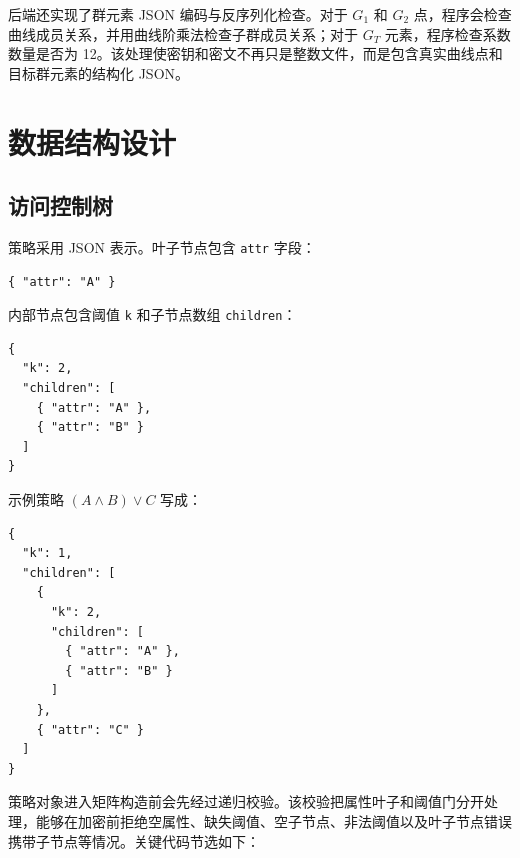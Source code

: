 后端还实现了群元素 JSON 编码与反序列化检查。对于 $G_1$ 和 $G_2$ 点，程序会检查曲线成员关系，并用曲线阶乘法检查子群成员关系；对于 $G_T$ 元素，程序检查系数数量是否为 12。该处理使密钥和密文不再只是整数文件，而是包含真实曲线点和目标群元素的结构化 JSON。

\section{数据结构设计}

\subsection{访问控制树}

策略采用 JSON 表示。叶子节点包含 \verb|attr| 字段：

\begin{lstlisting}[caption={叶子属性节点示例}]
{ "attr": "A" }
\end{lstlisting}

内部节点包含阈值 \verb|k| 和子节点数组 \verb|children|：

\begin{lstlisting}[caption={阈值门节点示例}]
{
  "k": 2,
  "children": [
    { "attr": "A" },
    { "attr": "B" }
  ]
}
\end{lstlisting}

示例策略 $(A\wedge B)\vee C$ 写成：

\begin{lstlisting}[caption={示例访问策略 JSON}]
{
  "k": 1,
  "children": [
    {
      "k": 2,
      "children": [
        { "attr": "A" },
        { "attr": "B" }
      ]
    },
    { "attr": "C" }
  ]
}
\end{lstlisting}

策略对象进入矩阵构造前会先经过递归校验。该校验把属性叶子和阈值门分开处理，能够在加密前拒绝空属性、缺失阈值、空子节点、非法阈值以及叶子节点错误携带子节点等情况。关键代码节选如下：

